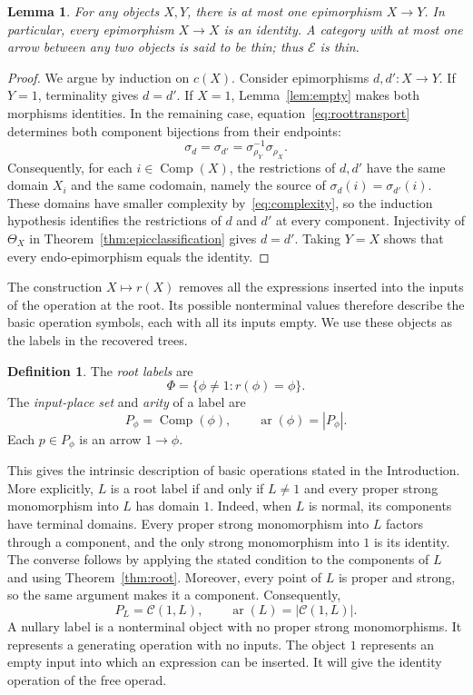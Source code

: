 \documentclass[11pt,a4paper]{article}
\theoremstyle{plain}
\newtheorem{lemma}[theorem]{Lemma}
\theoremstyle{definition}
\newtheorem{definition}[theorem]{Definition}
\theoremstyle{remark}
\newcommand{\C}{\mathcal C}
\newcommand{\Dcat}{\mathcal E}
\newcommand{\one}{1}
\newcommand{\Comp}{\operatorname{Comp}}
\begin{document}
\begin{lemma}\label{prop:thin}
For any objects $X,Y$, there is at most one epimorphism $X\to Y$.
In particular, every epimorphism $X\to X$ is an identity. A category
with at most one arrow between any two objects is said to be
\emph{thin}; thus $\Dcat$ is thin.
\end{lemma}
\begin{proof}
We argue by induction on $c(X)$. Consider epimorphisms
$d,d':X\to Y$. If $Y=\one$, terminality gives $d=d'$.
If $X=\one$, Lemma~\ref{lem:empty} makes both morphisms
identities. In the remaining case,
equation~\eqref{eq:roottransport} determines both component bijections
from their endpoints:
\[
 \sigma_d=\sigma_{d'}=
 \sigma_{\rho_Y}^{-1}\sigma_{\rho_X}.
\]
Consequently, for each $i\in\Comp(X)$, the restrictions of $d,d'$
have the same domain $X_i$ and the same codomain, namely the source
of $\sigma_d(i)=\sigma_{d'}(i)$. These domains have smaller complexity
by~\eqref{eq:complexity}, so the induction hypothesis identifies
the restrictions of $d$ and $d'$ at every component. Injectivity
of $\Theta_X$ in Theorem~\ref{thm:epicclassification} gives
$d=d'$. Taking $Y=X$ shows that every endo-epimorphism equals
the identity.
\end{proof}

The construction $X\mapsto r(X)$ removes all the expressions
inserted into the inputs of the operation at the root. Its
possible nonterminal values therefore describe the basic
operation symbols, each with all its inputs empty. We use
these objects as the labels in the recovered trees.
\begin{definition}\label{def:labels}
The \emph{root labels} are
\[
 \Phi=\{\phi\ne\one:r(\phi)=\phi\}.
\]
The \emph{input-place set} and \emph{arity} of a label are
\[
P_\phi=\Comp(\phi),\qquad \operatorname{ar}(\phi)=|P_\phi|.
\]
Each $p\in P_\phi$ is an arrow $\one\to\phi$.
\end{definition}

This gives the intrinsic description of basic operations stated
in the Introduction. More explicitly, $L$ is a root label if and
only if $L\ne\one$ and every proper strong monomorphism into $L$
has domain $\one$. Indeed, when $L$ is normal, its components
have terminal domains. Every proper strong monomorphism into
$L$ factors through a component, and the only strong
monomorphism into $\one$ is its identity. The converse follows
by applying the stated condition to the components of $L$ and
using Theorem~\ref{thm:root}. Moreover, every point of $L$ is
proper and strong, so the same argument makes it a component.
Consequently,
\[
P_L=\C(\one,L),\qquad \operatorname{ar}(L)=|\C(\one,L)|.
\]
A nullary label is a nonterminal object with no proper strong
monomorphisms. It represents a generating operation with no inputs.
The object $\one$ represents an empty input into which an
expression can be inserted. It will give the identity operation
of the free operad.
\end{document}
